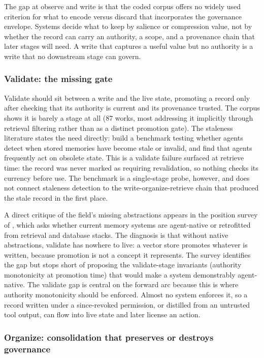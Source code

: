The gap at observe and write is that the coded corpus offers no widely used criterion for what to encode versus discard that incorporates the governance envelope. Systems decide what to keep by salience or compression value, not by whether the record can carry an authority, a scope, and a provenance chain that later stages will need. A write that captures a useful value but no authority is a write that no downstream stage can govern.

\subsubsection{Validate: the missing gate}

Validate should sit between a write and the live state, promoting a record only after checking that its authority is current and its provenance trusted. The corpus shows it is barely a stage at all ($87$ works, most addressing it implicitly through retrieval filtering rather than as a distinct promotion gate). The staleness literature states the need directly: \citet{chao2026stalellmagentsknow} build a benchmark testing whether agents detect when stored memories have become stale or invalid, and find that agents frequently act on obsolete state. This is a validate failure surfaced at retrieve time: the record was never marked as requiring revalidation, so nothing checks its currency before use. The benchmark is a single-stage probe, however, and does not connect staleness detection to the write-organize-retrieve chain that produced the stale record in the first place.

A direct critique of the field's missing abstractions appears in the position survey of \citet{zhou2026agentnative}, which asks whether current memory systems are agent-native or retrofitted from retrieval and database stacks. The diagnosis is that without native abstractions, validate has nowhere to live: a vector store promotes whatever is written, because promotion is not a concept it represents. The survey identifies the gap but stops short of proposing the validate-stage invariants (authority monotonicity at promotion time) that would make a system demonstrably agent-native. The validate gap is central on the forward arc because this is where authority monotonicity should be enforced. Almost no system enforces it, so a record written under a since-revoked permission, or distilled from an untrusted tool output, can flow into live state and later license an action.

\subsubsection{Organize: consolidation that preserves or destroys governance}

